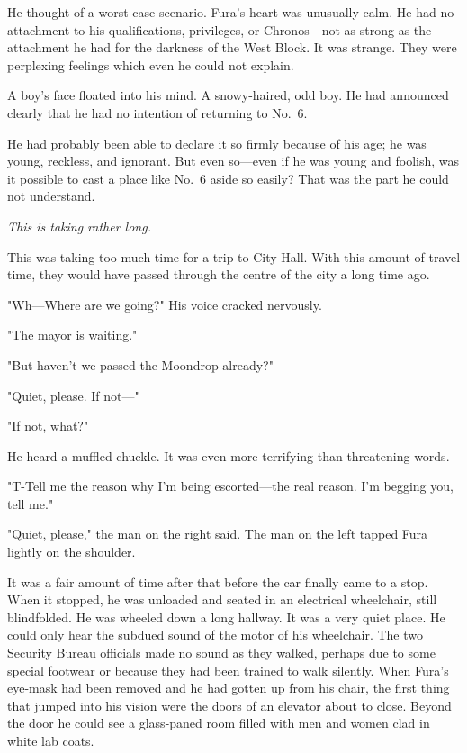He thought of a worst-case scenario. Fura's heart was unusually calm. He
had no attachment to his qualifications, privileges, or Chronos---not as
strong as the attachment he had for the darkness of the West Block. It
was strange. They were perplexing feelings which even he could not
explain.

A boy's face floated into his mind. A snowy-haired, odd boy. He had
announced clearly that he had no intention of returning to No.~6.

He had probably been able to declare it so firmly because of his age; he
was young, reckless, and ignorant. But even so---even if he was young and
foolish, was it possible to cast a place like No.~6 aside so easily?
That was the part he could not understand.

\emph{This is taking rather long.}

This was taking too much time for a trip to City Hall. With this amount
of travel time, they would have passed through the centre of the city a
long time ago.

"Wh---Where are we going?" His voice cracked nervously.

"The mayor is waiting."

"But haven't we passed the Moondrop already?"

"Quiet, please. If not---"

"If not, what?"

He heard a muffled chuckle. It was even more terrifying than threatening
words.

"T-Tell me the reason why I'm being escorted---the real reason. I'm
begging you, tell me."

"Quiet, please," the man on the right said. The man on the left tapped
Fura lightly on the shoulder.

It was a fair amount of time after that before the car finally came to a
stop. When it stopped, he was unloaded and seated in an electrical
wheelchair, still blindfolded. He was wheeled down a long hallway. It
was a very quiet place. He could only hear the subdued sound of the
motor of his wheelchair. The two Security Bureau officials made no sound
as they walked, perhaps due to some special footwear or because they had
been trained to walk silently. When Fura's eye-mask had been removed and
he had gotten up from his chair, the first thing that jumped into his
vision were the doors of an elevator about to close. Beyond the door he
could see a glass-paned room filled with men and women clad in white lab
coats.


